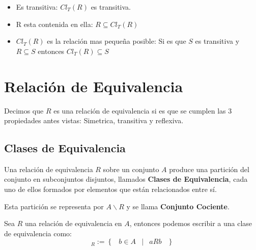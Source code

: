 \documentclass[12pt, fleqn]{report}                             %
\DeclareMathOperator \Space {\quad}                             %
\DeclareMathOperator \MiniSpace {\;}                            %
\newcommand \Such {\MiniSpace|\MiniSpace}                       %
\newcommand{\Set}[1]{\left\{ \MiniSpace #1 \MiniSpace \right\}} %
\begin{document}
                \begin{itemize}
                    \item Es transitiva: $Cl_T(R)$ es transitiva. 
                    \item R esta contenida en ella: $R \subseteq Cl_T(R)$
                    \item $Cl_T(R)$ es la relación mas pequeña posible: 
                    Si es que $S$ es transitiva y $R \subseteq S$ entonces $Cl_T(R) \subseteq S$
                \end{itemize}


        \clearpage
        \section{Relación de Equivalencia}
            Decimos que $R$ es una relación de equivalencia si es que se cumplen las 3
            propiedades antes vistas: Simetrica, transitiva y reflexiva.


            \subsection{Clases de Equivalencia}

                Una relación de equivalencia $R$ sobre un conjunto $A$ produce una partición
                del conjunto en subconjuntos disjuntos, llamados \textbf{Clases de
                Equivalencia}, cada uno de ellos formados por elementos que están
                relacionados entre sí.

                Esta partición se representa por $A \backslash R$ y se llama
                \textbf{Conjunto Cociente}.

                Sea $R$ una relación de equivalencia en $A$, entonces podemos escribir
                a una clase de equivalencia como:
                \begin{equation*}
                    [a]_R := \Set{ b \in A \Such a R b}
                \end{equation*} 


\end{document}

